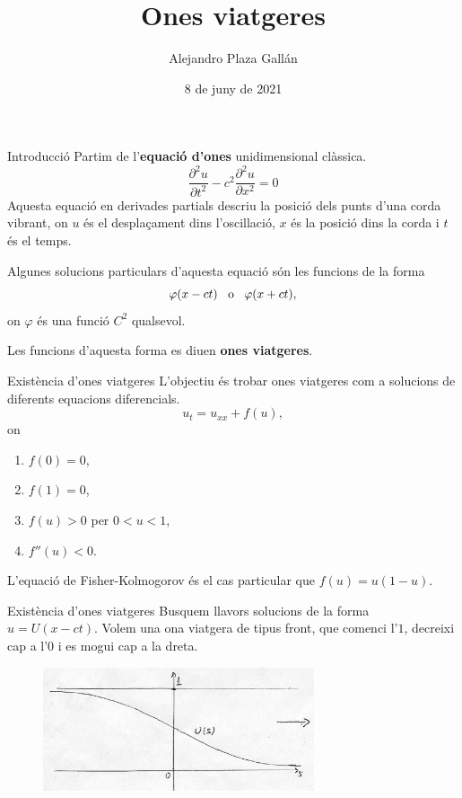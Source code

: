 \documentclass{beamer}
\title{Ones viatgeres}
\author{Alejandro Plaza Gall\'{a}n}
\date{8 de juny de 2021}
\theoremstyle{definition}
\begin{document}
\begin{frame}
\titlepage
\end{frame}

\begin{frame}{Introducci\'{o}}
Partim de l'\textbf{equaci\'{o} d'ones} unidimensional cl\`{a}ssica.
\[\frac{\partial^2u}{\partial t^2}-c^2\frac{\partial^2u}{\partial x^2}=0\]
\pause
Aquesta equaci\'{o} en derivades partials descriu la posici\'{o} dels punts d'una corda vibrant, on $u$ \'{e}s el despla\c{c}ament dins l'oscil\textperiodcentered laci\'{o}, $x$ \'{e}s la posici\'{o} dins la corda i $t$ \'{e}s el temps.
\pause

Algunes solucions particulars d'aquesta equaci\'{o} s\'{o}n les funcions de la forma
\[\varphi(x-ct)\hspace{3mm}\text{o}\hspace{3mm}\varphi(x+ct),\]
on $\varphi$ \'{e}s una funci\'{o} $C^2$ qualsevol.
\pause

Les funcions d'aquesta forma es diuen \textbf{ones viatgeres}.
\end{frame}

\begin{frame}{Exist\`{e}ncia d'ones viatgeres}
L'objectiu \'{e}s trobar ones viatgeres com a solucions de diferents equacions diferencials.
\pause
\[u_t=u_{xx}+f(u),\]
\pause
on
\begin{enumerate}
\item $f(0)=0$,
\pause
\item $f(1)=0$,
\pause
\item $f(u)>0$ per $0<u<1$,
\pause
\item $f''(u)<0$.
\end{enumerate}
\pause
L'equaci\'{o} de Fisher-Kolmogorov \'{e}s el cas particular que $f(u)=u(1-u)$.
\end{frame}

\begin{frame}{Exist\`{e}ncia d'ones viatgeres}
Busquem llavors solucions de la forma $u=U(x-ct)$. Volem una ona viatgera de tipus front, que comenci l'$1$, decreixi cap a l'$0$ i es mogui cap a la dreta.
\begin{figure}[ht!]
\begin{center}
\includegraphics[width=8cm]{Front.jpg}
\end{center}
\end{figure}
\end{frame}
\end{document}

